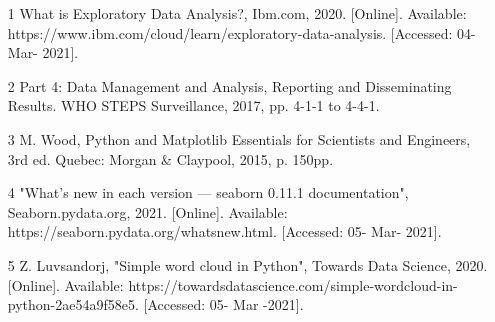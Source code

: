 \documentclass[12pt,a4paper]{article}
\begin{document}
\begin{enumerate}
    \item [1] What is Exploratory Data Analysis?, Ibm.com, 2020. [Online]. Available: https://www.ibm.com/cloud/learn/exploratory-data-analysis. [Accessed: 04- Mar- 2021].
    
    \item [2] Part 4: Data Management and Analysis, Reporting and Disseminating Results. WHO STEPS Surveillance, 2017, pp. 4-1-1 to 4-4-1.

    \item [3] M. Wood, Python and Matplotlib Essentials for Scientists and Engineers, 3rd ed. Quebec: Morgan & Claypool, 2015, p. 150pp.

    \item [4] "What’s new in each version — seaborn 0.11.1 documentation", Seaborn.pydata.org, 2021. [Online]. Available: https://seaborn.pydata.org/whatsnew.html. [Accessed: 05- Mar- 2021].
    
    \item [5] Z. Luvsandorj, "Simple word cloud in Python", Towards Data Science, 2020. [Online]. Available: https://towardsdatascience.com/simple-wordcloud-in-python-2ae54a9f58e5. [Accessed: 05- Mar -2021].

\end{enumerate}
\printbibliography
\end{document}
